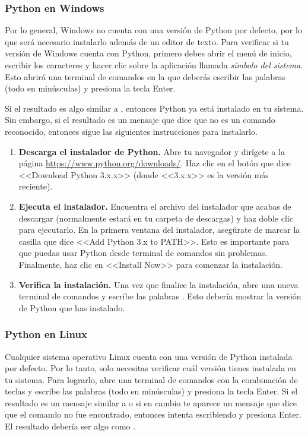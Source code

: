\subsubsection{Python en Windows}
Por lo general, Windows no cuenta con una versión de Python por defecto, por lo que será necesario instalarlo además de un editor de texto. Para verificar si tu versión de Windows cuenta con Python, primero debes abrir el menú de inicio, escribir los caracteres  y hacer clic sobre la aplicación llamada \emph{símbolo del sistema}. Esto abrirá una terminal de comandos en la que deberás escribir las palabras  (todo en minúsculas) y presiona la tecla Enter. 

Si el resultado es algo similar a , entonces Python ya está instalado en tu sistema. Sin embargo, si el resultado es un mensaje que dice que  no es un comando reconocido, entonces sigue las siguientes instrucciones para instalarlo.

\begin{enumerate}
    \item \textbf{Descarga el instalador de Python.} Abre tu navegador y dirígete a la página \url{https://www.python.org/downloads/}. Haz clic en el botón que dice <<Download Python 3.x.x>> (donde <<3.x.x>> es la versión más reciente). 
    
    \item \textbf{Ejecuta el instalador.} Encuentra el archivo del instalador que acabas de descargar (normalmente estará en tu carpeta de descargas) y haz doble clic para ejecutarlo.
    En la primera ventana del instalador, asegúrate de marcar la casilla que dice <<Add Python 3.x to PATH>>. Esto es importante para que puedas usar Python desde terminal de comandos sin problemas. Finalmente, haz clic en <<Install Now>> para comenzar la instalación.
    
    \item \textbf{Verifica la instalación.} Una vez que finalice la instalación, abre una nueva terminal de comandos y escribe las palabras . Esto debería mostrar la versión de Python que has instalado.
\end{enumerate}

\subsubsection{Python en Linux}
Cualquier sistema operativo Linux cuenta con una versión de Python instalada por defecto. Por lo tanto, solo necesitas verificar cuál versión tienes instalada en tu sistema. Para lograrlo, abre una terminal de comandos con la combinación de teclas  y escribe las palabras  (todo en minúsculas) y presiona la tecla Enter. Si el resultado es un mensaje similar a  o si en cambio te aparece un mensaje que dice que el comando  no fue encontrado, entonces intenta escribiendo  y presiona Enter. El resultado debería ser algo como .

